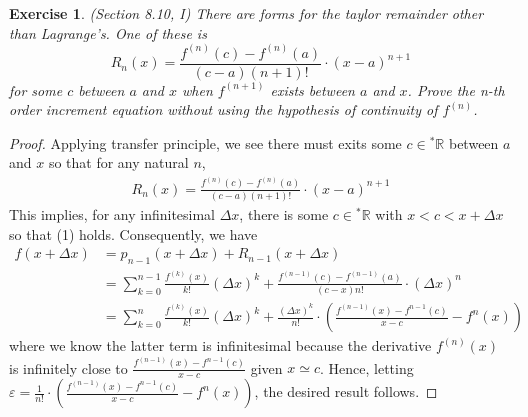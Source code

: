 \documentclass[a4paper, 11pt, openany]{book}
\theoremstyle{plain}
\newtheorem{exercise}{Exercise}[chapter]
\theoremstyle{plain}
\newcommand{\R}{\mathbb{R}}
\newcommand{\ep}{\varepsilon}
\newcommand{\hyp}{{}^*}
\newcommand{\Del}{\Delta}
\begin{document}
    \begin{exercise}
      (Section 8.10, I)
      There are forms for the taylor remainder other than Lagrange's. One of these is $$R_n(x)=\frac{f^{(n)}(c)-f^{(n)}(a)}{(c-a)(n+1)!} \cdot (x-a)^{n+1}$$ for some $c$ between $a$ and $x$ when $f^{(n+1)}$ exists between $a$ and $x$. Prove the n-th order increment equation without using the hypothesis of continuity of $f^{(n)}$.
    \end{exercise}
    \begin{proof}
      Applying transfer principle, we see there must exits some $c \in \hyp \R$ between $a$ and $x$ so that for any natural $n$, 
      \begin{align*}
        R_n(x)=\frac{f^{(n)}(c)-f^{(n)}(a)}{(c-a)(n+1)!} \cdot (x-a)^{n+1} \tag{1}
      \end{align*} 
      This implies, for any infinitesimal $\Del x$, there is some $c \in \hyp \R$ with $x<c<x+\Del x$ so that (1) holds. Consequently, we have
      \begin{align*}
        f(x+\Del x) &= p_{n-1}(x+\Del x)+R_{n-1}(x+\Del x) \\
        &=\sum_{k=0}^{n-1} \frac{f^{(k)}(x)}{k!}(\Del x)^k + \frac{f^{(n-1)}(c)-f^{(n-1)}(a)}{(c-x)n!} \cdot (\Del x)^{n} \\
        &=\sum_{k=0}^n \frac{f^{(k)}(x)}{k!}(\Del x)^k +\frac{(\Del x)^k}{n!} \cdot \left(\frac{f^{(n-1)}(x)-f^{n-1}(c)}{x-c} - f^n(x) \right) 
      \end{align*}
      where we know the latter term is infinitesimal because the derivative $f^{(n)}(x)$ is infinitely close to $\frac{f^{(n-1)}(x)-f^{n-1}(c)}{x-c}$ given $x \simeq c$. Hence, letting $\ep=\frac{1}{n!} \cdot \left(\frac{f^{(n-1)}(x)-f^{n-1}(c)}{x-c} - f^n(x) \right) $, the desired result follows.
    \end{proof}
\end{document}
